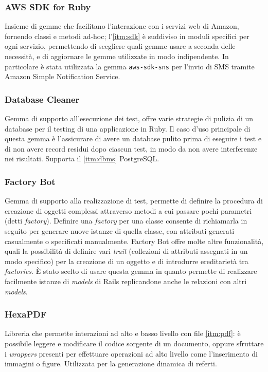 \subsubsection{AWS SDK for Ruby}
Insieme di gemme che facilitano l'interazione con i servizi web di Amazon, fornendo classi e metodi ad-hoc; l'\ref{itm:sdk} è suddiviso in moduli specifici per ogni servizio, permettendo di scegliere quali gemme usare a seconda delle necessità, e di aggiornare le gemme utilizzate in modo indipendente. In particolare è stata utilizzata la gemma \texttt{aws-sdk-sns} per l'invio di SMS tramite Amazon Simple Notification Service.

\subsubsection{Database Cleaner}
Gemma di supporto all'esecuzione dei test, offre varie strategie di pulizia di un database per il testing di una applicazione in Ruby. Il caso d'uso principale di questa gemma è l'assicurare di avere un database pulito prima di eseguire i test e di non avere record residui dopo ciascun test, in modo da non avere interferenze nei risultati. Supporta il \ref{itm:dbms} PostgreSQL.

\subsubsection{Factory Bot}
Gemma di supporto alla realizzazione di test, permette di definire la procedura di creazione di oggetti complessi attraverso metodi a cui passare pochi parametri (detti \textit{factory}). Definire una \textit{factory} per una classe consente di richiamarla in seguito per generare nuove istanze di quella classe, con attributi generati casualmente o specificati manualmente. Factory Bot offre molte altre funzionalità, quali la possibilità di definire vari \textit{trait} (collezioni di attributi assegnati in un modo specifico) per la creazione di un oggetto e di introdurre ereditarietà tra \textit{factories}. È stato scelto di usare questa gemma in quanto permette di realizzare facilmente istanze di \textit{models} di Rails replicandone anche le relazioni con altri \textit{models}. 

\subsubsection{HexaPDF}
Libreria che permette interazioni ad alto e basso livello con file \ref{itm:pdf}: è possibile leggere e modificare il codice sorgente di un documento, oppure sfruttare i \textit{wrappers} presenti per effettuare operazioni ad alto livello come l'inserimento di immagini o figure. Utilizzata per la generazione dinamica di referti.

